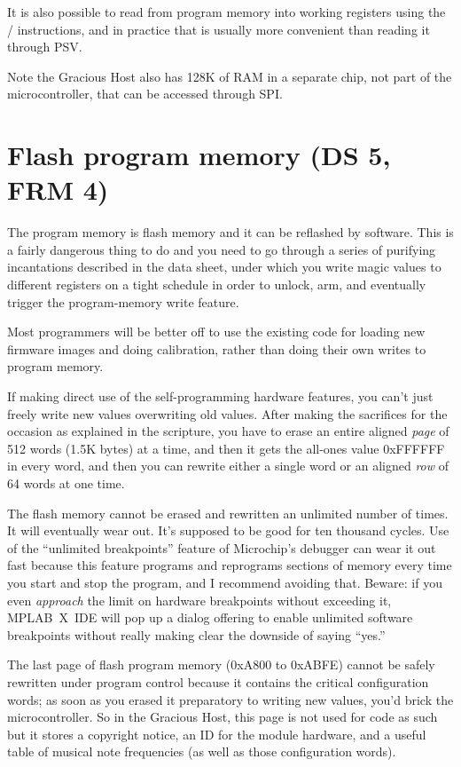 It is also possible to read from program memory into working registers using
the / instructions, and in practice that is
usually more convenient than reading it through PSV.

Note the Gracious Host also has 128K of RAM in a separate chip, not part of
the microcontroller, that can be accessed through SPI.


\section{Flash program memory (DS 5, FRM 4)}

The program memory is flash memory and it can be reflashed by software. 
This is a fairly dangerous thing to do and you need to go through a series
of purifying incantations described in the data sheet, under which you write
magic values to different registers on a tight schedule in order to unlock,
arm, and eventually trigger the program-memory write feature.

Most programmers will be better off to use the existing code for
loading new firmware images and doing calibration, rather than doing their
own writes to program memory.

If making direct use of the self-programming hardware features, you can't
just freely write new values overwriting old values.  After making the
sacrifices for the occasion as explained in the scripture, you have to erase
an entire aligned \emph{page} of 512 words (1.5K bytes) at a time, and then
it gets the all-ones value 0xFFFFFF in every word, and then you can rewrite
either a single word or an aligned \emph{row} of 64 words at one time.

The flash memory cannot be erased and rewritten an unlimited number of
times.  It will eventually wear out.  It's supposed to be good for ten
thousand cycles.  Use of the ``unlimited breakpoints'' feature of
Microchip's debugger can wear it out fast because this feature programs and
reprograms sections of memory every time you start and stop the program, and
I recommend avoiding that.  Beware: if you even \emph{approach} the limit on
hardware breakpoints without exceeding it, MPLAB~X~IDE will pop up a dialog
offering to enable unlimited software breakpoints without really making
clear the downside of saying ``yes.''

The last page of flash program memory (0xA800 to 0xABFE) cannot be safely
rewritten under program control because it contains the critical
configuration words; as soon as you erased it preparatory to writing new
values, you'd brick the microcontroller.  So in the Gracious Host, this page
is not used for code as such but it stores a copyright notice, an ID for the
module hardware, and a useful table of musical note frequencies (as well as
those configuration words).

